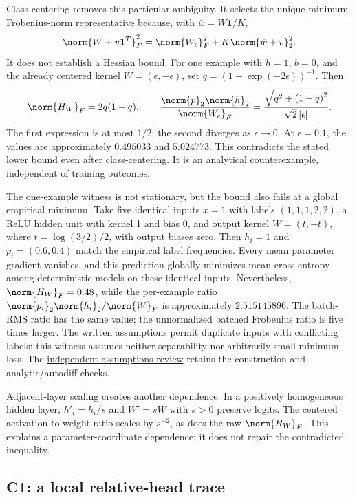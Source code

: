 Class-centering removes this particular ambiguity. It selects the unique minimum-Frobenius-norm representative because, with $\bar w=W\mathbf{1}/K$,
\begin{equation}
    \norm{W+v\mathbf{1}^T}_F^2
    =\norm{W_c}_F^2+K\norm{\bar w+v}_2^2.
\end{equation}
It does not establish a Hessian bound. For one example with $h=1$, $b=0$, and the already centered kernel $W=(\epsilon,-\epsilon)$, set $q={(1+\exp(-2\epsilon))}^{-1}$. Then
\begin{equation}
    \norm{H_W}_F=2q(1-q),\qquad
    \frac{\norm{p}_2\norm{h}_2}{\norm{W_c}_F}
    =\frac{\sqrt{q^2+{(1-q)}^2}}{\sqrt{2}\,|\epsilon|}.
\end{equation}
The first expression is at most $1/2$; the second diverges as $\epsilon\to 0$. At $\epsilon=0.1$, the values are approximately $0.495033$ and $5.024773$. This contradicts the stated lower bound even after class-centering. It is an analytical counterexample, independent of training outcomes.

The one-example witness is not stationary, but the bound also fails at a global empirical minimum. Take five identical inputs $x=1$ with labels $(1,1,1,2,2)$, a ReLU hidden unit with kernel 1 and bias 0, and output kernel $W=(t,-t)$, where $t=\log(3/2)/2$, with output biases zero. Then $h_i=1$ and $p_i=(0.6,0.4)$ match the empirical label frequencies. Every mean parameter gradient vanishes, and this prediction globally minimizes mean cross-entropy among deterministic models on these identical inputs. Nevertheless, $\norm{H_W}_F=0.48$, while the per-example ratio $\norm{p_i}_2\norm{h_i}_2/\norm{W}_F$ is approximately $2.515145896$. The batch-RMS ratio has the same value; the unnormalized batched Frobenius ratio is five times larger. The written assumptions permit duplicate inputs with conflicting labels; this witness assumes neither separability nor arbitrarily small minimum loss. The \href{run:../sweep-results/research-audit-20261002/theory-assumptions-review/review.md}{independent assumptions review} retains the construction and analytic/autodiff checks.

Adjacent-layer scaling creates another dependence. In a positively homogeneous hidden layer, $h'_i=h_i/s$ and $W'=sW$ with $s>0$ preserve logits. The centered activation-to-weight ratio scales by $s^{-2}$, as does the raw $\norm{H_W}_F$. This explains a parameter-coordinate dependence; it does not repair the contradicted inequality.

\subsection{C1: a local relative-head trace}

